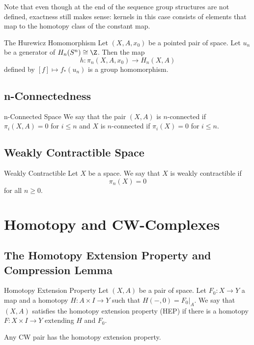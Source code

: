 \documentclass[a4paper]{article}
\begin{document}
Note that even though at the end of the sequence group structures are not defined, exactness still makes sense: kernels in this case consists of elements that map to the homotopy class of the constant map. 

\begin{thm}{The Hurewicz Homomorphism}{} Let $(X,A,x_0)$ be a pointed pair of space. Let $u_n$ be a generator of $H_n(S^n)\cong\Z$. Then the map $$h:\pi_n(X,A,x_0)\to H_n(X,A)$$ defined by $[f]\mapsto f_\ast(u_n)$ is a group homomorphism. 
\end{thm}

\subsection{n-Connectedness}
\begin{defn}{n-Connected Space}{} We say that the pair $(X,A)$ is $n$-connected if $\pi_i(X,A)=0$ for $i\leq n$ and $X$ is $n$-connected if $\pi_i(X)=0$ for $i\leq n$. 
\end{defn}

\subsection{Weakly Contractible Space}
\begin{defn}{Weakly Contractible}{} Let $X$ be a space. We say that $X$ is weakly contractible if $$\pi_n(X)=0$$ for all $n\geq 0$. 
\end{defn}

\pagebreak
\section{Homotopy and CW-Complexes}
\subsection{The Homotopy Extension Property and Compression Lemma}
\begin{defn}{Homotopy Extension Property}{} Let $(X,A)$ be a pair of space. Let $F_0:X\to Y$ a map and a homotopy $H:A\times I\to Y$ such that $H(-,0)=F_0|_A$. We say that $(X,A)$ satisfies the homotopy extension property (HEP) if there is a homotopy $F:X\times I\to Y$ extending $H$ and $F_0$. 
\end{defn}

\begin{prp}{}{} Any CW pair has the homotopy extension property. 
\end{prp}
\end{document}
